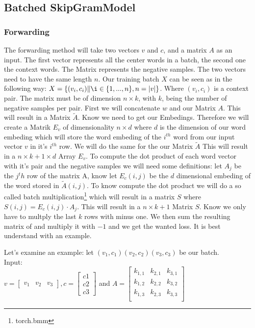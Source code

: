 \subsection{Batched SkipGramModel}

\subsubsection{Forwarding}\label{subsubsec:forwarding}
The forwarding method will take two vectors $v$ and $c$, and a matrix $A$ as an input. The first vector represents all the center words in a batch, the second one the context words. The Matrix represents the negative samples. The two vectors need to have the same length $n$. Our training batch $X$ can be seen as in the following way:  $X = \{(v_i, c_i)\|\i \in \{1, ..., n\}, n = |v| \}$. Where $(v_i,c_i)$ is a context pair. The matrix must be of dimension $n \times k$, with $k$, being the number of negative samples per pair.  First we will concatenate $w$ and our Matrix $A$. This will result in a Matrix $\tilde{A}$.  Know we need to get our Embedings. Therefore we will create a Matrik $E_v$ of dimensionality $n \times d$ where $d$ is the dimension of our word embeding which will store the word embeding of the $i^{th}$ word from our input vector $v$ in it's $i^{th}$ row. We will do the same for the our Matrix $\tilde{A}$ This will result in a $n \times k+1 \times d$ Array $E_v$. To compute the dot product of each word vector with it's pair and the negative samples we will need some definitions: let $A_j$ be the $j^th$ row of the matrix A, know let $E_c(i,j)$ be the $d$ dimensional embeding of the word stored in $\tilde{A}(i,j)$. To know compute the dot product we will do a so called batch multiplication\footnote{torch.bmm} which will result in a matrix $S$ where $S(i,j) = E_c(i,j) \cdot A_j$. This will result in a $n\times k+1$ Matrix $S$. Know we only have to multply the last $k$ rows with minus one.  We then sum the resulting matrix of and multiply it with $-1$  and we get the wanted loss. It is best understand with an example. 

Let's examine an example: let $(v_1,c_1)(v_2,c_2)(v_3,c_3)$ be our batch. \\
Input:\\
 $v = \begin{bmatrix}
v_1 & v_2 & v_3
\end{bmatrix}, c = \begin{bmatrix}
c1\\
c2\\
c3\end{bmatrix}$ and $A = 
\begin{bmatrix}
k_{1,1} & k_{2,1} & k_{3,1}\\
k_{1,2} & k_{2,2} & k_{3,2}\\
k_{1,3} & k_{2,3} & k_{3,3}\\
\end{bmatrix}$\\

